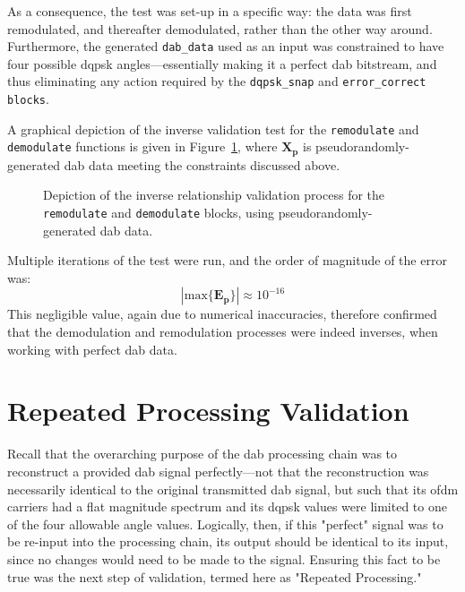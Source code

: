 \documentclass[class=report,11pt,crop=false]{standalone}
\begin{document}
As a consequence, the test was set-up in a specific way: the data was first remodulated, and thereafter demodulated, rather than the other way around. Furthermore, the generated \texttt{dab\_data} used as an input was constrained to have four possible \gls{dqpsk} angles---essentially making it a perfect \gls{dab} bitstream, and thus eliminating any action required by the \texttt{dqpsk\_snap} and \texttt{error\_correct blocks}.

A graphical depiction of the inverse validation test for the \texttt{remodulate} and \texttt{demodulate} functions is given in Figure~\ref{fig:inverse-remod-demod}, where \(\mathbf{X_p}\) is pseudorandomly-generated \gls{dab} data meeting the constraints discussed above.

\begin{figure}[htbp]
  \centering
  \captionsetup{type=figure}
  \def\svgwidth{\linewidth}
  { %
      }
  \caption{Depiction of the inverse relationship validation process for the \texttt{remodulate} and \texttt{demodulate} blocks, using pseudorandomly-generated \gls{dab} data.}
  \label{fig:inverse-remod-demod}
\end{figure}

Multiple iterations of the test were run, and the order of magnitude of the error was:
\begin{equation}
  \left| \mathrm{max} \{ \mathbf{E_p} \} \right| \approx 10^{-16}
\end{equation}
This negligible value, again due to numerical inaccuracies, therefore confirmed that the demodulation and remodulation processes were indeed inverses, when working with perfect \gls{dab} data.

\section{Repeated Processing Validation}
Recall that the overarching purpose of the \gls{dab} processing chain was to reconstruct a provided \gls{dab} signal perfectly---not that the reconstruction was necessarily identical to the original transmitted \gls{dab} signal, but such that its \gls{ofdm} carriers had a flat magnitude spectrum and its \gls{dqpsk} values were limited to one of the four allowable angle values. Logically, then, if this "perfect" signal was to be re-input into the processing chain, its output should be identical to its input, since no changes would need to be made to the signal. Ensuring this fact to be true was the next step of validation, termed here as "Repeated Processing."
\end{document}
